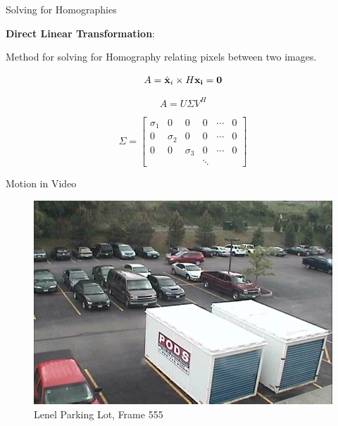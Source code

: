 \documentclass{beamer}
\begin{document}
\begin{frame}[t]{\sc Solving for Homographies}

\textbf{Direct Linear Transformation}:

\begin{center}
Method for solving for Homography relating pixels between two images.

\begin{equation}
\label{DLT}
	A=\hat{\bf{x}}_{i} \times H \bf{x}_{i}=0
\end{equation}

\begin{equation}
\label{DLTSVD}
	A=U \Sigma V^{H}
\end{equation}

\begin{equation}
\label{SVD}
	\Sigma = \begin{bmatrix}\sigma_{1}&0&0&0&\cdots&0 \\ 0&\sigma_{2}&0&0&\cdots&0 \\ 0&0&\sigma_{3}&0&\cdots&0 \\ &&&\ddots&& \end{bmatrix}
\end{equation}

\end{center}

\end{frame}



\begin{frame}[c]{\sc Motion in Video}

\begin{figure}[!h]
\centering
\includegraphics[width=.9\columnwidth]{Lenel010L(555)}
\caption{Lenel Parking Lot, Frame 555}
\label{Lenel555}
\end{figure}

\end{frame}
\end{document}
